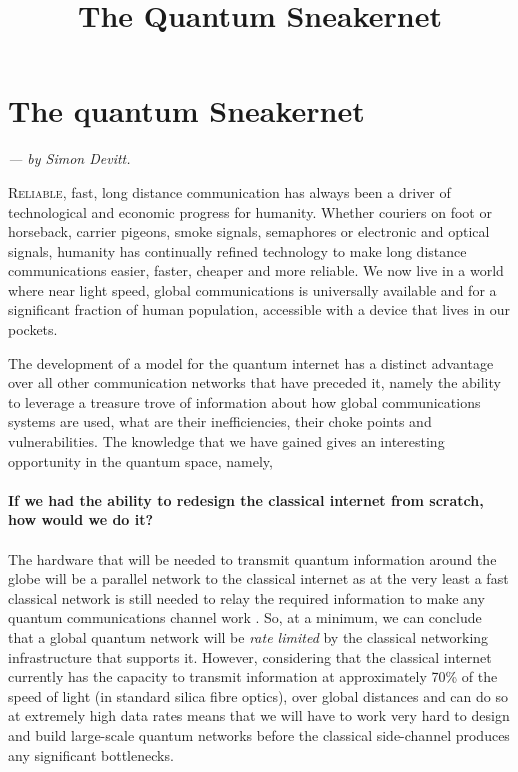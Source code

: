 \documentclass[twocolumn, aps, rmp, amsmath, amssymb, nofootinbib, superscriptaddress, longbibliography, floatfix, table-of-contents, eqsecnum]{revtex4-2}
\newcommand{\sectionby}[1]{\begin{center}\textit{--- by #1.}\end{center}}
\newcommand{\dropcap}[2]{\lettrine[lines=2, findent=3pt, nindent=0pt]{#1}{#2}}
\begin{document}
\title{The Quantum Sneakernet}

\maketitle

\tableofcontents 

\section{The quantum Sneakernet\texttrademark}\label{sec:sneakernet}

\sectionby{Simon Devitt}

\dropcap{R}{eliable}, fast, long distance communication has always been a driver of technological and economic progress for humanity. Whether couriers on foot or horseback, carrier pigeons, smoke signals, semaphores or electronic and optical signals, humanity has continually refined technology to make long distance communications easier, faster, cheaper and more reliable. We now live in a world where near light speed, global communications is universally available and for a significant fraction of human population, accessible with a device that lives in our pockets. 

The development of a model for the quantum internet \cite{?} has a distinct advantage over all other communication networks that have preceded it, namely the ability to leverage a treasure trove of information about how global communications systems are used, what are their inefficiencies, their choke points and vulnerabilities. The knowledge that we have gained gives an interesting opportunity in the quantum space, namely, 
\\
\\
\textbf{If we had the ability to redesign the classical internet from scratch, how would we do it?}
\\
\\
The hardware that will be needed to transmit quantum information around the globe will be a parallel network to the classical internet as at the very least a fast classical network is still needed to relay the required information to make any quantum communications channel work \cite{?}. So, at a minimum, we can conclude that a global quantum network will be \textit{rate limited} by the classical networking infrastructure that supports it. However, considering that the classical internet currently has the capacity to transmit information at approximately 70\% of the speed of light (in standard silica fibre optics), over global distances and can do so at extremely high data rates means that we will have to work very hard to design and build large-scale quantum networks before the classical side-channel produces any significant bottlenecks. 
\end{document}
